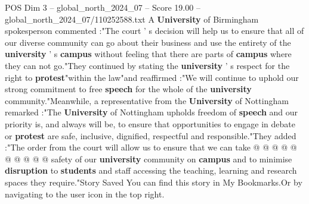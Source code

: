\begin{textsample}{POS Dim 3 – global\_north\_2024\_07 – Score 19.00 – global\_north\_2024\_07/110252588.txt}
A \textbf{University} of Birmingham spokesperson commented :"The court ' s decision will help us to ensure that all of our diverse community can go about their business and use the entirety of the \textbf{university} ' s \textbf{campus} without feeling that there are parts of \textbf{campus} where they can not go."They continued by stating the \textbf{university} ' s respect for the right to \textbf{protest}"within the law"and reaffirmed :"We will continue to uphold our strong commitment to free \textbf{speech} for the whole of the \textbf{university} community."Meanwhile, a representative from the \textbf{University} of Nottingham remarked :"The \textbf{University} of Nottingham upholds freedom of \textbf{speech} and our priority is, and always will be, to ensure that opportunities to engage in debate or \textbf{protest} are safe, inclusive, dignified, respectful and responsible."They added :"The order from the court will allow us to ensure that we can take @ @ @ @ @ @ @ @ @ @ safety of our \textbf{university} community on \textbf{campus} and to minimise \textbf{disruption} to \textbf{students} and staff accessing the teaching, learning and research spaces they require."Story Saved You can find this story in My Bookmarks.Or by navigating to the user icon in the top right.

\end{textsample}
